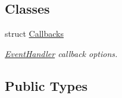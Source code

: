 \subsection*{Classes}
\begin{DoxyCompactItemize}
\item 
struct \hyperlink{structflow__ros_1_1_event_handler_1_1_callbacks}{Callbacks}
\begin{DoxyCompactList}\small\item\em \hyperlink{classflow__ros_1_1_event_handler}{Event\+Handler} callback options. \end{DoxyCompactList}\end{DoxyCompactItemize}
\subsection*{Public Types}
